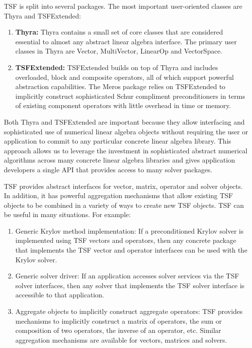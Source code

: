 \documentclass[12pt,relax]{TrilinosOverview}
\begin{document}
TSF is split into several packages.  The most important user-oriented
classes are Thyra and TSFExtended:
\begin{enumerate}
\item {\bf Thyra:} Thyra contains a small set
of core classes that are considered essential to almost any abstract
linear algebra interface.  The primary user classes in Thyra are
Vector, MultiVector, LinearOp and VectorSpace. 
\item {\bf TSFExtended:} TSFExtended builds on top of Thyra and
includes overloaded, block and composite operators, all of
which support powerful abstraction capabilities.  The Meros package
relies on TSFExtended to implicitly construct sophisticated
Schur compliment preconditioners in terms of existing component
operators with little overhead in time or memory.
\end{enumerate}

Both Thyra and TSFExtended are important because they allow
interfacing and sophisticated use of numerical linear algebra objects
without requiring the user or application to commit to any particular
concrete linear algebra library.  This approach allows us to leverage
the investment in sophisticated abstract numerical algorithms across
many concrete linear algebra libraries and gives application
developers a single API that provides access to many solver packages.

TSF provides abstract interfaces for vector, matrix, operator and 
solver objects.  In addition, it has powerful aggregation mechanisms 
that allow existing TSF objects to be combined in a variety of ways 
to create new TSF objects.  TSF can be useful in many situations.  
For example:
\begin{enumerate}

\item Generic Krylov method implementation:  If a preconditioned Krylov solver 
is implemented using TSF vectors and operators, then any concrete package 
that implements the TSF vector and operator interfaces can be used 
with the Krylov solver.

\item Generic solver driver:  If an application accesses solver 
services via the TSF solver interfaces, then any solver that 
implements the TSF solver interface is accessible to that application.

\item Aggregate objects to implicitly construct aggregate operators: 
TSF provides mechanisms to implicitly construct a matrix of operators, 
the sum or composition of two operators, the inverse of an operator, 
etc.  Similar aggregation mechanisms are available for vectors, matrices
and solvers.

\end{enumerate}
\end{document}
